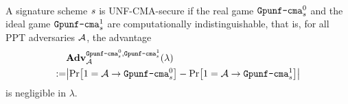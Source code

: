 \begin{security}
\begin{codebox}
\begin{center}
\begin{pchstack}
\begin{pcvstack}
{																	\sk\text{:} \<\quad {}\\
 				                  \text{:} \<\quad {} 
			              }
          \pcvspace
          \pcvspace
          \pcvspace
  \end{pcvstack}
  \end{pchstack}
  \end{center}
\end{codebox}
\vspace{5mm}

A signature scheme $\mathit{{s}}$ is UNF-CMA-secure if the real game $\text{\texttt{Gpunf\text{-}cma}}^0_{\mathit{{s}}}$ and the ideal game $\text{\texttt{Gpunf\text{-}cma}}^1_{\mathit{{s}}}$ are computationally indistinguishable, that is, for all PPT adversaries $\mathcal{A}$, the advantage
\begin{align*}
&\mathbf{Adv}_{\adv}^{
  \M{Gpunf\text{-}cma}^0_\s,
  \M{Gpunf\text{-}cma}^1_\s}
	(\lambda) \\
:=&\abs{\prob{1=\adv\circ \M{Gpunf\text{-}cma}^0_\s}-\prob{1=\adv\circ \M{Gpunf\text{-}cma}^1_\s}}
\end{align*}
is negligible in $\lambda$.
\end{security}

